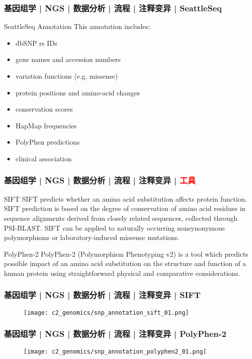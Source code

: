 \begin{frame}
  \frametitle{基因组学 | NGS | 数据分析 | 流程 | 注释变异 | SeattleSeq}
  \begin{block}{SeattleSeq Annotation}
  This annotation includes:
  \begin{itemize}
    \item dbSNP rs IDs
    \item gene names and accession numbers
    \item variation functions (e.g. missense)
    \item protein positions and amino-acid changes
    \item conservation scores
    \item HapMap frequencies
    \item PolyPhen predictions
    \item clinical association
  \end{itemize}
  \end{block}
\end{frame}

\begin{frame}
  \frametitle{基因组学 | NGS | 数据分析 | 流程 | 注释变异 | \textcolor{red}{工具}}
  \begin{block}{SIFT}
    SIFT predicts whether an amino acid substitution affects protein function. SIFT prediction is based on the degree of conservation of amino acid residues in sequence alignments derived from closely related sequences, collected through PSI-BLAST. SIFT can be applied to naturally occurring nonsynonymous polymorphisms or laboratory-induced missense mutations.
  \end{block}
  \pause
  \begin{block}{PolyPhen-2}
    PolyPhen-2 (Polymorphism Phenotyping v2) is a tool which predicts possible impact of an amino acid substitution on the structure and function of a human protein using straightforward physical and comparative considerations.
  \end{block}
\end{frame}

\begin{frame}
  \frametitle{基因组学 | NGS | 数据分析 | 流程 | 注释变异 | SIFT}
  \begin{figure}
    \centering
    \texttt{[image: c2\_genomics/snp\_annotation\_sift\_01.png]}
  \end{figure}
\end{frame}

\begin{frame}
  \frametitle{基因组学 | NGS | 数据分析 | 流程 | 注释变异 | PolyPhen-2}
  \begin{figure}
    \centering
    \texttt{[image: c2\_genomics/snp\_annotation\_polyphen2\_01.png]}
  \end{figure}
\end{frame}

